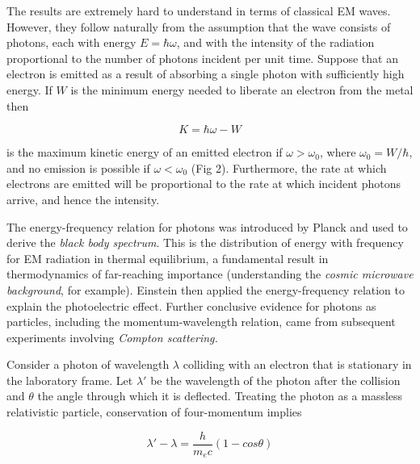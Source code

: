 \documentclass[a4paper]{article}
\begin{document}
The results are extremely hard to understand in terms of classical EM waves. However, they follow naturally from the assumption that the wave consists of photons, each with energy $ E = \hbar \omega $, and with the intensity of the radiation proportional to the number of photons incident per unit time. Suppose that an electron is emitted as a result of absorbing a single photon with sufficiently high energy. If $ W $ is the minimum energy needed to liberate an electron from the metal then

\[ K = \hbar \omega - W \]

is the maximum kinetic energy of an emitted electron if $ \omega > \omega_{0} $, where $ \omega_{0}  = W / \hbar $, and no emission is possible if $ \omega < \omega_{0} $ (Fig 2). Furthermore, the rate at which electrons are emitted will be proportional to the rate at which incident photons arrive, and hence the intensity.

\begin{center}
\end{center}






The energy-frequency relation for photons was introduced by Planck and used to derive the \emph{black body spectrum}. This is the distribution of energy with frequency for EM radiation in thermal equilibrium, a fundamental result in thermodynamics of far-reaching importance (understanding the \emph{cosmic microwave background}, for example). Einstein then applied the energy-frequency relation to explain the photoelectric effect. Further conclusive evidence for photons as particles, including the momentum-wavelength relation, came from subsequent experiments involving \emph{Compton scattering. }

Consider a photon of wavelength $ \lambda $ colliding with an electron that is stationary in the laboratory frame. Let $ \lambda' $ be the wavelength of the photon after the collision and $ \theta $ the angle through which it is deflected. Treating the photon as a massless relativistic particle, conservation of four-momentum implies

\[ \lambda' - \lambda = \frac{h}{m_{e}c} (1 - cos \theta) \] 
\end{document}
